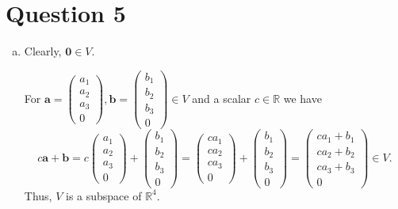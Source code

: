 \documentclass{article}
\begin{document}
\section*{Question 5}
\begin{enumerate}[(a)]
    \item Clearly, $\textbf{0}\in V.$
    
    For $\textbf{a}=\begin{pmatrix}a_1\\a_2\\a_3\\0\end{pmatrix},\textbf{b}=\begin{pmatrix}b_1\\b_2\\b_3\\0\end{pmatrix}\in V$ and a scalar $c\in\mathbb{R}$ we have $$c\textbf{a}+\textbf{b}=c\begin{pmatrix}a_1\\a_2\\a_3\\0\end{pmatrix}+\begin{pmatrix}b_1\\b_2\\b_3\\0\end{pmatrix}=\begin{pmatrix}ca_1\\ca_2\\ca_3\\0\end{pmatrix}+\begin{pmatrix}b_1\\b_2\\b_3\\0\end{pmatrix}=\begin{pmatrix}ca_1+b_1\\ca_2+b_2\\ca_3+b_3\\0\end{pmatrix}\in V.$$
    Thus, $V$ is a subspace of $\mathbb{R}^4.$
    

\end{enumerate}
\end{document}
